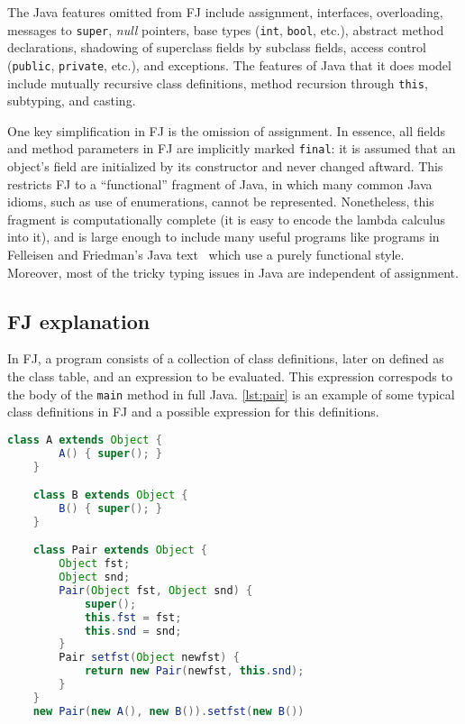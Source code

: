 The Java features omitted from FJ include assignment, interfaces, overloading,
messages to \texttt{super}, \textit{null} pointers, base types (\texttt{int},
\texttt{bool}, etc.), abstract method declarations, shadowing of superclass
fields by subclass fields, access control (\texttt{public}, \texttt{private},
etc.), and exceptions. The features of Java that it does model include mutually
recursive class definitions, method recursion through \texttt{this}, subtyping,
and casting.

One key simplification in FJ is the omission of assignment. In essence, all
fields and method parameters in FJ are implicitly marked \texttt{final}: it is
assumed that an object's field are initialized by its constructor and never
changed aftward. This restricts FJ to a ``functional'' fragment of Java, in
which many common Java idioms, such as use of enumerations, cannot be
represented. Nonetheless, this fragment is computationally complete (it is easy
to encode the lambda calculus into it), and is large enough to include many
useful programs like programs in Felleisen and Friedman's Java
text~\cite{felleisen1998} which use a purely functional style. Moreover, most
of the tricky typing issues in Java are independent of assignment. 

\subsection{FJ explanation}
In FJ, a program consists of a collection of class definitions, later on
defined as the class table, and an expression to be evaluated. This expression
correspods to the body of the \texttt{main} method in full Java.
\cref{lst:pair} is an example of some typical class definitions in FJ and a
possible expression for this definitions.

\begin{lstlisting}[frame = single, language=Java, label={lst:pair}, caption={FJ Pair Example}, language=Java, float,floatplacement=H]
    class A extends Object {
        A() { super(); } 
    } 

    class B extends Object { 
        B() { super(); }
    } 

    class Pair extends Object { 
        Object fst; 
        Object snd;
        Pair(Object fst, Object snd) { 
            super(); 
            this.fst = fst; 
            this.snd = snd; 
        } 
        Pair setfst(Object newfst) { 
            return new Pair(newfst, this.snd); 
        } 
    } 
    new Pair(new A(), new B()).setfst(new B())
\end{lstlisting}

